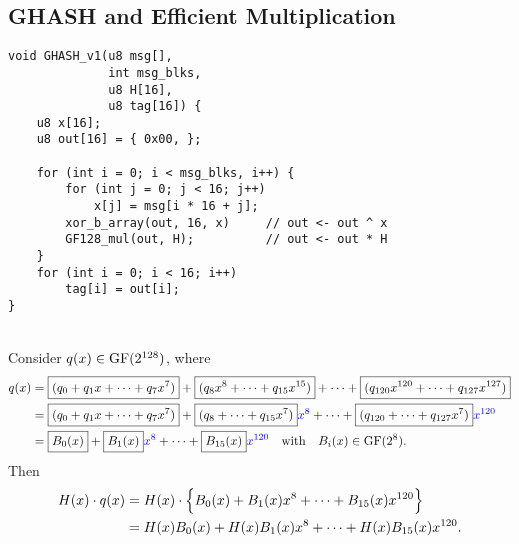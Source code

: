\subsection{GHASH and Efficient Multiplication}
\begin{lstlisting}[style=C]
void GHASH_v1(u8 msg[],
			  int msg_blks,
			  u8 H[16],
			  u8 tag[16]) {
	u8 x[16];
	u8 out[16] = { 0x00, };
	
	for (int i = 0; i < msg_blks, i++) {
		for (int j = 0; j < 16; j++)
			x[j] = msg[i * 16 + j];
		xor_b_array(out, 16, x) 	// out <- out ^ x
		GF128_mul(out, H); 			// out <- out * H
	}
	for (int i = 0; i < 16; i++)
		tag[i] = out[i];
}
\end{lstlisting}
\vspace{40pt}\ \\
Consider $q(x)\in\normalfont\text{GF}(2^{128})$, where \begin{align*}
	q(x) &= \boxed{(q_0+q_1x+\cdots+q_7x^7)}+\boxed{(q_8x^8+\cdots+q_{15}x^{15})}+\cdots+\boxed{(q_{120}x^{120}+\cdots+q_{127}x^{127})} \\
	&= \boxed{(q_0+q_1x+\cdots+q_7x^7)}+\boxed{(q_8+\cdots+q_{15}x^{7})}\textcolor{blue}{x^8}+\cdots+\boxed{(q_{120}+\cdots+q_{127}x^{7})}\textcolor{blue}{x^{120}} \\
	&= \boxed{B_0(x)}+\boxed{B_1(x)}\textcolor{blue}{x^8}+\cdots+\boxed{B_{15}(x)}\textcolor{blue}{x^{120}}\quad\text{with}\quad B_i(x)\in\normalfont\text{GF}(2^8).
\end{align*}
Then \begin{align*}
	H(x)\cdot q(x) &= H(x)\cdot\set{B_0(x)+B_1(x)x^8+\cdots+B_{15}(x)x^{120}}\\
	&= H(x)B_0(x)+H(x)B_1(x)x^8+\cdots+H(x)B_{15}(x)x^{120}.
\end{align*} 

